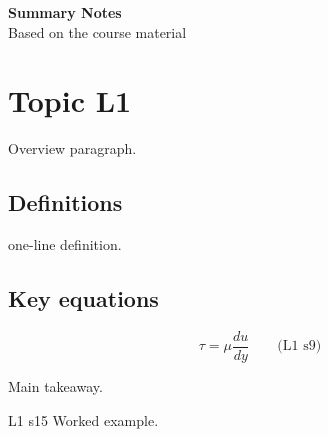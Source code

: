 \documentclass[11pt,a4paper]{article}
\newenvironment{defs}{\begin{description}[nosep,leftmargin=0pt,labelsep=0.4em,font=\bfseries,itemsep=2pt]}{\end{description}}
\begin{document}
\begin{center}
{\LARGE\bfseries %
Summary Notes}\\[3pt]
{\small %
Based on the course material}
\end{center}

\section{%
Topic \hfill{\normalsize\sffamily L1}}

Overview paragraph.

\subsection*{Definitions}
\begin{defs}
\item[Term:] one-line definition. %
\end{defs}

\subsection*{Key equations}
\begin{equation}
\tau=\mu\frac{du}{dy}\qquad\text{(L1 s9)} %
\end{equation}

\begin{keyidea}
Main takeaway.
\end{keyidea}

\begin{example}{%
L1 s15}
Worked example.
\end{example}
\end{document}
